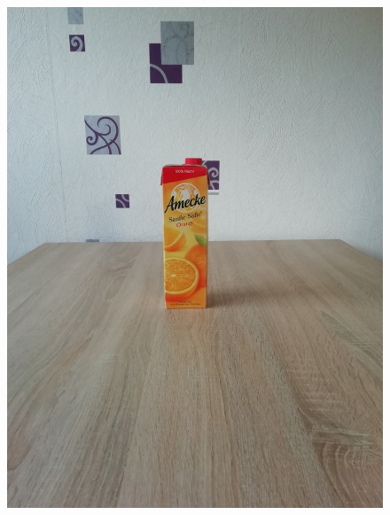 \documentclass[a4paper,12pt,oneside]{article}
\begin{document}
\begin{figure}[htb]
\begin{minipage}[c]{0.2\textwidth}
\includegraphics[width=\textwidth]{Sources/Bild1.jpg}
\end{minipage}
\hfill
\begin{minipage}[c]{0.08\textwidth}

\end{minipage}
\end{figure}
\end{document}
